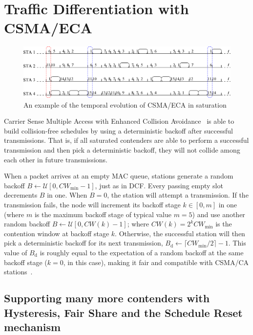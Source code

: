 \section{Traffic Differentiation with CSMA/ECA}\label{section3}

\begin{figure}[t!]
\centering
	\includegraphics[width=0.9\linewidth]{figures/csma_eca_different_backoff_short.eps}
	\caption{An example of the temporal evolution of CSMA/ECA in saturation}
	\label{fig:ECA}
\end{figure}
	
Carrier Sense Multiple Access with Enhanced Collision Avoidance~\cite{sanabria2014high, research2standards} is able to build collision-free schedules by using a deterministic backoff after successful transmissions. That is, if all saturated contenders are able to perform a successful transmission and then pick a deterministic backoff, they will not collide among each other in future transmissions.
	
When a packet arrives at an empty MAC queue, stations generate a random backoff $B\leftarrow\mathcal{U}[0,CW_{\min}-1]$, just as in DCF. Every passing empty slot decrements $B$ in one. When $B=0$, the station will attempt a transmission. If the transmission fails, the node will increment its backoff stage $k\in[0,m]$ in one (where $m$ is the maximum backoff stage of typical value $m=5$) and use another random backoff $B\leftarrow\mathcal{U}[0,CW(k)-1]$; where $CW(k)=2^{k}CW_{\min}$ is the contention window at backoff stage $k$. Otherwise, the successful station will then pick a deterministic backoff for its next transmission, $B_{\text{d}}\leftarrow \lceil CW_{\min}/2\rceil-1$. This value of $B_{\text{d}}$ is roughly equal to the expectation of a random backoff at the same backoff stage ($k=0$, in this case), making it fair and compatible with CSMA/CA stations~\cite{research2standards}.

\subsection{Supporting many more contenders with Hysteresis, Fair Share and the Schedule Reset mechanism}\label{scheduleReset}

